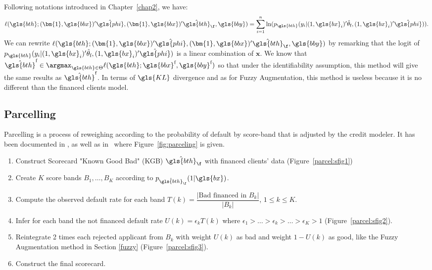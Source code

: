 Following notations introduced in Chapter~\ref{chap2}, we have:
\[ \ell(\gls{bth};(\bm{1},\gls{bbx})' \hat{\gls{phi}}, (\bm{1},\gls{bbx})' \hat{\gls{bth}}_\f, \gls{bby}) = \sum_{i=1}^{n} \ln(p_{\gls{bth}}(y_i | (1, \gls{bx}_i)' \hat{\theta}_{\text{f}}, (1, \gls{bx}_i)' \hat{\gls{phi}})).\]
We can rewrite $\ell(\gls{bth};(\bm{1},\gls{bbx})' \hat{\gls{phi}}, (\bm{1},\gls{bbx})' \hat{\gls{bth}}_\f, \gls{bby})$ by remarking that the logit of $p_{\gls{bth}}(y_i | (1, \gls{bx}_i)' \hat{\theta}_{\text{f}}, (1, \gls{bx}_i)' \hat{\gls{phi}})$ is a linear combination of $\bm{x}$.
We know that $\hat{\gls{bth}}^{\text{f}} \in \argmax_{\gls{bth} \in \Theta} \ell(\gls{bth};\gls{bbx}^{\text{f}},\gls{bby}^{\text{f}})$ so that under the identifiability assumption, this method will give the same results as $\hat{\gls{bth}}^{\text{f}}$. In terms of $\gls{KL}$ divergence and as for Fuzzy Augmentation, this method is useless because it is no different than the financed clients model.

\subsection{Parcelling} \label{Parceling}

Parcelling is a process of reweighing according to the probability of default by score-band that is adjusted by the credit modeler. It has been documented in \cite{saporta,banasik,RI6}, as well as in~\cite{groupe} where Figure~\ref{fig:parceling} is given.

\begin{enumerate}
\item Construct Scorecard "Known Good Bad" (KGB) $\hat{\gls{bth}}_\f$ with financed clients' data (Figure~\ref{parcel:sfig1})
\item Create $K$ score bands $B_1, \ldots, B_K$ according to $p_{\hat{\gls{bth}}_\f}(1 | \gls{bx})$.
\item Compute the observed default rate for each band $T(k) = \dfrac{|\text{Bad financed in } B_k|}{|B_k|}$, $1 \leq k  \leq K$.
\item Infer for each band the not financed default rate $U(k) = \epsilon_k T(k)$ where $\epsilon_1 > \ldots > \epsilon_k > \ldots > \epsilon_K > 1$ (Figure~\ref{parcel:sfig2}).
\item Reintegrate 2 times each rejected applicant from $B_k$ with weight $U(k)$ as bad and weight $1-U(k)$ as good, like the Fuzzy Augmentation method in Section \ref{fuzzy} (Figure~\ref{parcel:sfig3}).
\item Construct the final scorecard.
\end{enumerate}

